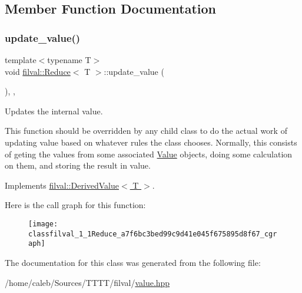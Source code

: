 \subsection{Member Function Documentation}
\hypertarget{classfilval_1_1Reduce_a7f6bc3bed99c9d41e045f675895d8f67}{}\label{classfilval_1_1Reduce_a7f6bc3bed99c9d41e045f675895d8f67} 
\subsubsection{\texorpdfstring{update\+\_\+value()}{update\_value()}}
{\footnotesize\ttfamily template$<$typename T$>$ \\
void \hyperlink{classfilval_1_1Reduce}{filval\+::\+Reduce}$<$ T $>$\+::update\+\_\+value (\begin{DoxyParamCaption}{ }\end{DoxyParamCaption})\hspace{0.3cm}{\ttfamily [inline]}, {\ttfamily [private]}, {\ttfamily [virtual]}}



Updates the internal value. 

This function should be overridden by any child class to do the actual work of updating value based on whatever rules the class chooses. Normally, this consists of geting the values from some associated \hyperlink{classfilval_1_1Value}{Value} objects, doing some calculation on them, and storing the result in value. 

Implements \hyperlink{classfilval_1_1DerivedValue_a74e04450a550454510329a9e6b941304}{filval\+::\+Derived\+Value$<$ T $>$}.

Here is the call graph for this function\+:
\nopagebreak
\begin{figure}[H]
\begin{center}
\leavevmode
\texttt{[image: classfilval\_1\_1Reduce\_a7f6bc3bed99c9d41e045f675895d8f67\_cgraph]}
\end{center}
\end{figure}


The documentation for this class was generated from the following file\+:\begin{DoxyCompactItemize}
\item 
/home/caleb/\+Sources/\+T\+T\+T\+T/filval/\hyperlink{value_8hpp}{value.\+hpp}\end{DoxyCompactItemize}
